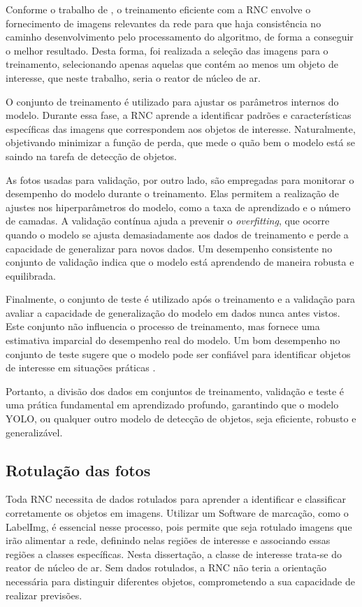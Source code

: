 Conforme o trabalho de \cite{sa2024yolov8}, o treinamento eficiente com a RNC envolve o fornecimento de imagens relevantes da rede para que haja consistência no caminho desenvolvimento pelo processamento do algoritmo, de forma a conseguir o melhor resultado. Desta forma, foi realizada a seleção das imagens para o treinamento, selecionando apenas aquelas que contém ao menos um objeto de interesse, que neste trabalho, seria o reator de núcleo de ar.

O conjunto de treinamento é utilizado para ajustar os parâmetros internos do modelo. Durante essa fase, a RNC aprende a identificar padrões e características específicas das imagens que correspondem aos objetos de interesse. Naturalmente, objetivando minimizar a função de perda, que mede o quão bem o modelo está se saindo na tarefa de detecção de objetos.

As fotos usadas para validação, por outro lado, são empregadas para monitorar o desempenho do modelo durante o treinamento. Elas permitem a realização de ajustes nos hiperparâmetros do modelo, como a taxa de aprendizado e o número de camadas. A validação contínua ajuda a prevenir o \textit{overfitting}, que ocorre quando o modelo se ajusta demasiadamente aos dados de treinamento e perde a capacidade de generalizar para novos dados. Um desempenho consistente no conjunto de validação indica que o modelo está aprendendo de maneira robusta e equilibrada.

Finalmente, o conjunto de teste é utilizado após o treinamento e a validação para avaliar a capacidade de generalização do modelo em dados nunca antes vistos. Este conjunto não influencia o processo de treinamento, mas fornece uma estimativa imparcial do desempenho real do modelo. Um bom desempenho no conjunto de teste sugere que o modelo pode ser confiável para identificar objetos de interesse em situações práticas \cite{goodfellow2016deep}.

Portanto, a divisão dos dados em conjuntos de treinamento, validação e teste é uma prática fundamental em aprendizado profundo, garantindo que o modelo YOLO, ou qualquer outro modelo de detecção de objetos, seja eficiente, robusto e generalizável.

\subsection{Rotulação das fotos}

Toda RNC necessita de dados rotulados para aprender a identificar e classificar corretamente os objetos em imagens. Utilizar um Software de marcação, como o LabelImg, é essencial nesse processo, pois permite que seja rotulado imagens que irão alimentar a rede, definindo nelas regiões de interesse e associando essas regiões a classes específicas. Nesta dissertação, a classe de interesse trata-se do reator de núcleo de ar. Sem dados rotulados, a RNC não teria a orientação necessária para distinguir diferentes objetos, comprometendo a sua capacidade de realizar previsões.

